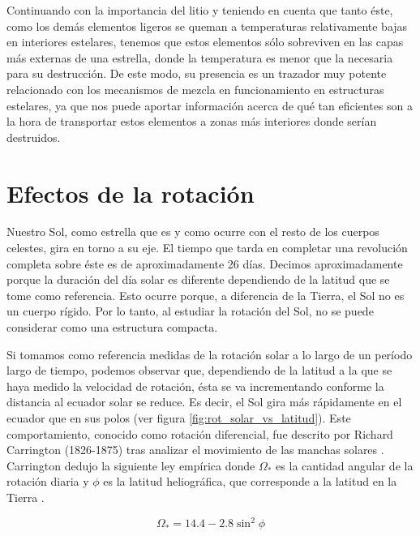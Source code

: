 Continuando con la importancia del litio y teniendo en cuenta que tanto éste, como los demás elementos ligeros se queman a temperaturas relativamente bajas en interiores estelares, tenemos que estos elementos sólo sobreviven en las capas más externas de una estrella, donde la temperatura es menor que la necesaria para su destrucción. De este modo, su presencia es un trazador muy potente relacionado con los mecanismos de mezcla en funcionamiento en estructuras estelares, ya que nos puede aportar información acerca de qué tan eficientes son a la hora de transportar estos elementos a zonas más interiores donde serían destruidos.\par

\section{Efectos de la rotación} \label{sec:efectos_rotacion}
Nuestro Sol, como estrella que es y como ocurre con el resto de los cuerpos celestes, gira en torno a su eje. El tiempo que tarda en completar una revolución completa sobre éste es de aproximadamente 26 días. Decimos aproximadamente porque la duración del día solar es diferente dependiendo de la latitud que se tome como referencia. Esto ocurre porque, a diferencia de la Tierra, el Sol no es un cuerpo rígido. Por lo tanto, al estudiar la rotación del Sol, no se puede considerar como una estructura compacta.\par

Si tomamos como referencia medidas de la rotación solar a lo largo de un período largo de tiempo, podemos observar que, dependiendo de la latitud a la que se haya medido la velocidad de rotación, ésta se va incrementando conforme la distancia al ecuador solar se reduce. Es decir, el Sol gira más rápidamente en el ecuador que en sus polos (ver figura \ref{fig:rot_solar_vs_latitud}). Este comportamiento, conocido como rotación diferencial, fue descrito por Richard Carrington (1826-1875) tras analizar el movimiento de las manchas solares \citep{Carrington1863}. Carrington dedujo la siguiente ley empírica donde $\Omega_*$ es la cantidad angular de la rotación diaria y $\phi$ es la latitud heliográfica, que corresponde a la latitud en la Tierra  \citep{Banisch2009}.\par

\begin{ceqn}
\begin{equation}
    \Omega_* = 14.4 - 2.8\sin^2\phi \label{eq:ang_rot_sun}
\end{equation}
\end{ceqn}


